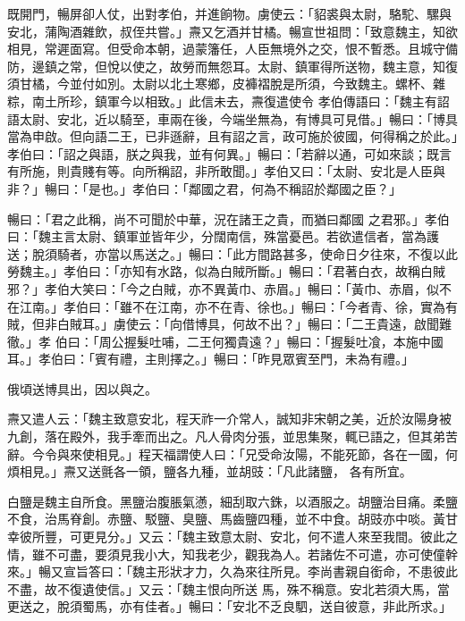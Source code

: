 \begin{pinyinscope}
 既開門，暢屏卻人仗，出對孝伯，并進餉物。虜使云：「貂裘與太尉，駱駝、騾與安北，蒲陶酒雜飲，叔侄共嘗。」燾又乞酒并甘橘。暢宣世祖問：「致意魏主，知欲相見，常遲面寫。但受命本朝，過蒙籓任，人臣無境外之交，恨不暫悉。且城守備防，邊鎮之常，但悅以使之，故勞而無怨耳。太尉、鎮軍得所送物，魏主意，知復須甘橘，今並付如別。太尉以北土寒鄉，皮褲褶脫是所須，今致魏主。螺杯、雜粽，南土所珍，鎮軍今以相致。」此信未去，燾復遣使令
 孝伯傳語曰：「魏主有詔語太尉、安北，近以騎至，車兩在後，今端坐無為，有博具可見借。」暢曰：「博具當為申啟。但向語二王，已非遜辭，且有詔之言，政可施於彼國，何得稱之於此。」孝伯曰：「詔之與語，朕之與我，並有何異。」暢曰：「若辭以通，可如來談；既言有所施，則貴賤有等。向所稱詔，非所敢聞。」孝伯又曰：「太尉、安北是人臣與非？」暢曰：「是也。」孝伯曰：「鄰國之君，何為不稱詔於鄰國之臣？」



 暢曰：「君之此稱，尚不可聞於中華，況在諸王之貴，而猶曰鄰國
 之君邪。」孝伯曰：「魏主言太尉、鎮軍並皆年少，分闊南信，殊當憂邑。若欲遣信者，當為護送；脫須騎者，亦當以馬送之。」暢曰：「此方間路甚多，使命日夕往來，不復以此勞魏主。」孝伯曰：「亦知有水路，似為白賊所斷。」暢曰：「君著白衣，故稱白賊邪？」孝伯大笑曰：「今之白賊，亦不異黃巾、赤眉。」暢曰：「黃巾、赤眉，似不在江南。」孝伯曰：「雖不在江南，亦不在青、徐也。」暢曰：「今者青、徐，實為有賊，但非白賊耳。」虜使云：「向借博具，何故不出？」暢曰：「二王貴遠，啟聞難徹。」孝
 伯曰：「周公握髮吐哺，二王何獨貴遠？」暢曰：「握髮吐飡，本施中國耳。」孝伯曰：「賓有禮，主則擇之。」暢曰：「昨見眾賓至門，未為有禮。」



 俄頃送博具出，因以與之。



 燾又遣人云：「魏主致意安北，程天祚一介常人，誠知非宋朝之美，近於汝陽身被九創，落在殿外，我手牽而出之。凡人骨肉分張，並思集聚，輒已語之，但其弟苦辭。今令與來使相見。」程天福謂使人曰：「兄受命汝陽，不能死節，各在一國，何煩相見。」燾又送氈各一領，鹽各九種，並胡豉：「凡此諸鹽，
 各有所宜。



 白鹽是魏主自所食。黑鹽治腹脹氣懣，細刮取六銖，以酒服之。胡鹽治目痛。柔鹽不食，治馬脊創。赤鹽、駁鹽、臭鹽、馬齒鹽四種，並不中食。胡豉亦中啖。黃甘幸彼所豐，可更見分。」又云：「魏主致意太尉、安北，何不遣人來至我間。彼此之情，雖不可盡，要須見我小大，知我老少，觀我為人。若諸佐不可遣，亦可使僮幹來。」暢又宣旨答曰：「魏主形狀才力，久為來往所見。李尚書親自銜命，不患彼此不盡，故不復遺使信。」又云：「魏主恨向所送
 馬，殊不稱意。安北若須大馬，當更送之，脫須蜀馬，亦有佳者。」暢曰：「安北不乏良駟，送自彼意，非此所求。」




\end{pinyinscope}
